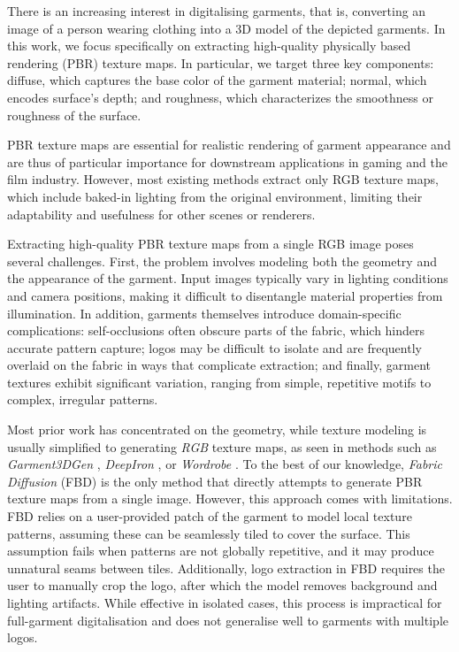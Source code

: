 \documentclass[11pt,twocolumn]{article}
\begin{document}
There is an increasing interest in digitalising garments, that is, converting an image of a person wearing clothing into a 3D model 
of the depicted garments. In this work, we focus specifically on extracting high-quality physically based rendering (PBR) 
texture maps. In particular, we target three key components: diffuse, which captures the base color of the garment material; 
normal, which encodes surface's depth; and roughness, which characterizes the smoothness or roughness of the surface.

PBR texture maps are essential for realistic rendering of garment appearance and are thus of particular importance for downstream applications 
in gaming and the film industry. However, most existing methods extract only RGB texture maps, 
which include baked-in lighting from the original environment, limiting their adaptability and usefulness for other 
scenes or renderers.

Extracting high-quality PBR texture maps from a single RGB image poses several challenges. 
First, the problem involves modeling both the geometry and the appearance of the garment. 
Input images typically vary in lighting conditions and camera positions, making it difficult to disentangle material 
properties from illumination. In addition, garments themselves introduce domain-specific complications: 
self-occlusions often obscure parts of the fabric, which hinders accurate pattern capture; 
logos may be difficult to isolate and are frequently overlaid on the fabric in ways that complicate extraction; 
and finally, garment textures exhibit significant variation, ranging from simple, repetitive motifs to complex, 
irregular patterns.

Most prior work has concentrated on the geometry, while texture modeling is usually simplified to generating \textit{RGB} 
texture maps, as seen in methods such as \textit{Garment3DGen} \cite{garment3dgen}, \textit{DeepIron} \cite{deepiron}, 
or \textit{Wordrobe} \cite{WordRobe}. To the best of our knowledge, \textit{Fabric Diffusion} (FBD) \cite{fabricdiffusion} is 
the only method that directly attempts to generate PBR texture maps from a single image. 
However, this approach comes with limitations. FBD relies on a user-provided patch of the garment to model local 
texture patterns, assuming these can be seamlessly tiled to cover the surface. This assumption fails when patterns are not 
globally repetitive, and it may produce unnatural seams between tiles. 
Additionally, logo extraction in FBD requires the user to manually crop the logo, 
after which the model removes background and lighting artifacts. 
While effective in isolated cases, this process is impractical for full-garment digitalisation and does not 
generalise well to garments with multiple logos.
\end{document}
